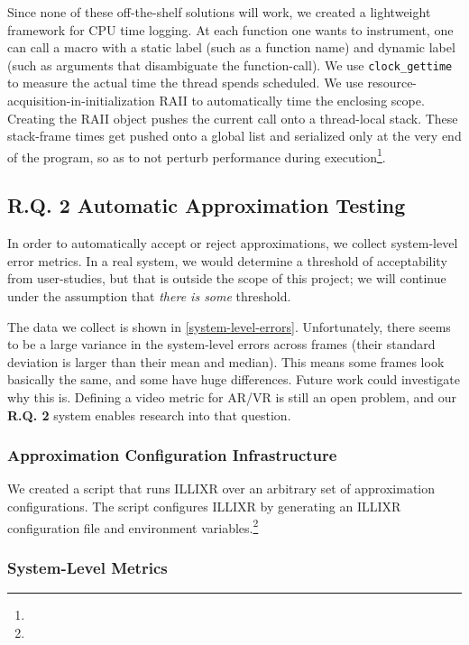 Since none of these off-the-shelf solutions will work, we created a lightweight framework for CPU time logging.
At each function one wants to instrument, one can call a macro with a static label (such as a function name) and dynamic label (such as arguments that disambiguate the function-call).
We use \verb+clock_gettime+ to measure the actual time the thread spends scheduled.
We use resource-acquisition-in-initialization RAII to automatically time the enclosing scope.
Creating the RAII object pushes the current call onto a thread-local stack.
These stack-frame times get pushed onto a global list and serialized only at the very end of the program, so as to not perturb performance during execution\footnote{}.

\subsection{R.Q. 2 Automatic Approximation Testing}

In order to automatically accept or reject approximations, we collect system-level error metrics.
In a real system, we would determine a threshold of acceptability from user-studies, but that is outside the scope of this project;
    we will continue under the assumption that \textit{there is some} threshold.

The data we collect is shown in \cref{system-level-errors}.
Unfortunately, there seems to be a large variance in the system-level errors across frames (their standard deviation is larger than their mean and median).
This means some frames look basically the same, and some have huge differences.
Future work could investigate why this is.
Defining a video metric for AR/VR is still an open problem, and our \textbf{R.Q. 2} system enables research into that question.

\subsubsection{Approximation Configuration Infrastructure}

We created a script that runs ILLIXR over an arbitrary set of approximation configurations.
The script configures ILLIXR by generating an ILLIXR configuration file and environment variables.\footnote{}

\subsubsection{System-Level Metrics}

